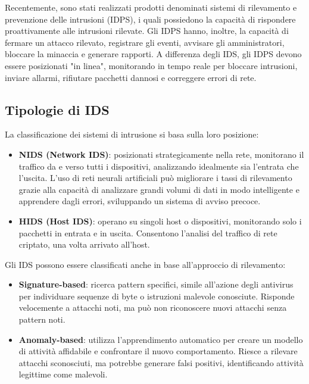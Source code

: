 \documentclass[12pt,a4paper,oneside,onecolumn,openright]{book}
\begin{document}
	Recentemente, sono stati realizzati prodotti denominati sistemi di rilevamento e prevenzione delle intrusioni (IDPS), i quali possiedono la capacità di rispondere proattivamente alle intrusioni rilevate. Gli IDPS hanno, inoltre, la capacità di fermare un attacco rilevato, registrare gli eventi, avvisare gli amministratori, bloccare la minaccia e generare rapporti. A differenza 
	degli IDS, gli IDPS devono essere posizionati "in linea", monitorando in tempo reale per bloccare intrusioni, inviare allarmi, rifiutare pacchetti dannosi e correggere errori di rete.\cite{idps}\\
	
	
	\subsection{Tipologie di IDS}
	La classificazione dei sistemi di intrusione si basa sulla loro posizione:
	\begin{itemize}
		\item \textbf{NIDS (Network IDS)}: posizionati strategicamente nella rete, monitorano il traffico da e verso tutti i dispositivi, analizzando idealmente sia l'entrata che l'uscita. L'uso di reti neurali artificiali può migliorare i tassi di rilevamento grazie alla capacità di analizzare grandi volumi di dati in modo intelligente e apprendere dagli errori, sviluppando un sistema di avviso precoce.\cite{taxonomy}
		\item \textbf{HIDS (Host IDS)}: operano su singoli host o dispositivi, monitorando solo i pacchetti in entrata e in uscita. Consentono l'analisi del traffico di rete criptato, una volta arrivato all'host.\cite{taxonomy}
	\end{itemize}
	Gli IDS possono essere classificati anche in base all'approccio di rilevamento:
	\begin{itemize}
		\item \textbf{Signature-based}: ricerca pattern specifici, simile all'azione degli antivirus per individuare sequenze di byte o istruzioni malevole conosciute. Risponde velocemente a attacchi noti, ma può non riconoscere nuovi attacchi senza pattern noti.\cite{signature}
		\item \textbf{Anomaly-based}: utilizza l'apprendimento automatico per creare un modello di attività affidabile e confrontare il nuovo comportamento. Riesce a rilevare attacchi sconosciuti, ma potrebbe generare falsi positivi, identificando attività legittime come malevoli.\cite{anomaly}
	\end{itemize}
	
\end{document}
